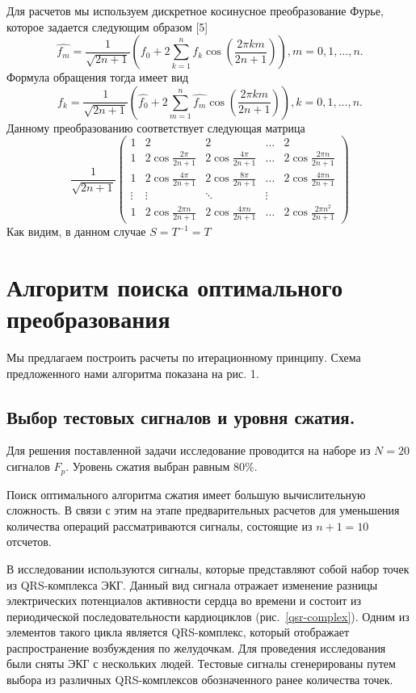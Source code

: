 \documentclass[11pt, oneside, a4paper]{article}
\begin{document}
Для расчетов мы используем дискретное косинусное преобразование Фурье, которое задается следующим образом [5]
\begin{equation}
\label{DCT}
\hat{f_m}=\frac{1}{\sqrt{2n+1}}(f_0+2\sum\limits_{k=1}^{n}f_k\cos(\frac{2 \pi k m}{2n+1})), m=0,1,...,n.
\end{equation}
Формула обращения тогда имеет вид
\begin{equation}
\label{inverseDCT}
f_k=\frac{1}{\sqrt{2n+1}}(\hat{f_0}+2\sum\limits_{m=1}^{n}\hat{f_m}\cos(\frac{2 \pi k m}{2n+1})), k=0,1,...,n.
\end{equation}
Данному преобразованию соответствует следующая матрица
\begin{equation}
\label{matrixDCT}
\frac{1}{\sqrt{2n+1}}\begin{pmatrix}
1 & 2 & 2 & \ldots & 2\\
1 & 2\cos\frac{2 \pi}{2n+1} & 2\cos\frac{4 \pi}{2n+1} & \ldots & 2\cos\frac{2 \pi n}{2n+1}\\
1 & 2\cos\frac{4 \pi}{2n+1} & 2\cos\frac{8 \pi}{2n+1} & \ldots & 2\cos\frac{4 \pi n}{2n+1}\\
\vdots & \vdots & \ddots & \vdots\\
1 & 2\cos\frac{2 \pi n}{2n+1} & 2\cos\frac{4 \pi n}{2n+1} & \ldots & 2\cos\frac{2 \pi n^2}{2n+1}
\end{pmatrix}
\end{equation}
Как видим, в данном случае $S=T^{-1}=T$

\section{Алгоритм поиска оптимального преобразования}

Мы предлагаем построить расчеты по итерационному принципу. Схема предложенного нами алгоритма показана на рис. 1.

\subsection{Выбор тестовых сигналов и уровня сжатия.}
Для решения поставленной задачи исследование проводится на наборе из $N=20$ сигналов $F_p$. Уровень сжатия выбран равным $80\%$. 

Поиск оптимального алгоритма сжатия имеет большую вычислительную сложность. В связи с этим на этапе предварительных расчетов для уменьшения количества операций рассматриваются сигналы, состоящие из $n+1=10$ отсчетов. 

В исследовании используются сигналы, которые представляют собой набор точек из QRS-комплекса ЭКГ. Данный вид сигнала отражает изменение разницы электрических потенциалов активности сердца во времени и состоит из периодической последовательности кардиоциклов (рис.~\ref{qsr-complex}). Одним из элементов такого цикла является QRS-комплекс, который отображает распространение возбуждения по желудочкам. Для проведения исследования были сняты ЭКГ с нескольких людей. Тестовые сигналы сгенерированы путем выбора из различных QRS-комплексов обозначенного ранее количества точек.
\end{document}
